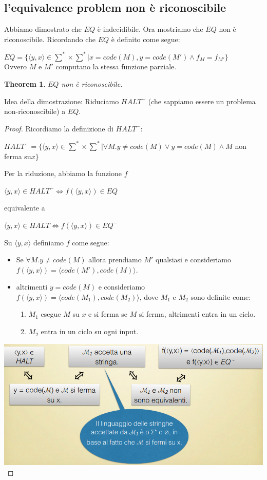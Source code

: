 \documentclass[a4paper, 12pt]{article}
\newtheorem{theorem}{Theorem}[section]
\begin{document}
\subsection{l'equivalence problem non \`e riconoscibile}
Abbiamo dimostrato che $EQ$ \`e indecidibile. Ora mostriamo che $EQ$ non \`e riconoscibile. Ricordando che $EQ$ \`e definito come segue:
\begin{center}
$EQ = \{\langle y,x \rangle \in \sum^{*}\times\sum^{*} | x=code(M),y=code(M') \land f_{M} = f_{M'}\}$\\
Ovvero $M$ e $M'$ computano la stessa funzione parziale.
\end{center}
\begin{theorem}
\label{th:7}
$EQ$ non \`e riconoscibile.
\end{theorem}
Idea della dimostrazione: Riduciamo $HALT^{-}$ (che sappiamo essere un problema non-riconoscibile) a $EQ$.
\begin{proof}
Ricordiamo la definizione di $HALT^{-}$:
\begin{center}
$HALT^{-} = \{\langle y,x \rangle \in \sum^{*} \times \sum^{*} | \forall M. y \neq code(M) \lor y=code(M) \land M$ non ferma su$x\}$
\end{center}
Per la riduzione, abbiamo la funzione $f$ \begin{center}
$\langle y, x \rangle \in HALT^{-} \iff f(\langle y,x\rangle) \in EQ$
\end{center}
equivalente a \begin{center}
$\langle y,x \rangle \in HALT \iff f(\langle y,x \rangle) \in EQ^{-}$
\end{center}
Su $\langle y,x\rangle$ definiamo $f$ come segue:
\begin{itemize}
\item Se $\forall M. y \neq code(M)$ allora prendiamo $M'$ qualsiasi e consideriamo \\$f(\langle y, x \rangle) = \langle code(M'), code(M)\rangle$.
\item altrimenti $y = code(M)$ e consideriamo $f(\langle y,x \rangle) = \langle code(M_1), code(M_2) \rangle$, dove $M_1$ e $M_2$ sono definite come:
\begin{enumerate}
\item $M_1$ esegue $M$ su $x$ e si ferma se $M$ si ferma, altrimenti entra in un ciclo.
\item $M_2$ entra in un ciclo su ogni input.\\
\end{enumerate}
\end{itemize}
\includegraphics[scale=0.4]{EQ2.png}\\
\end{proof}
\end{document}
